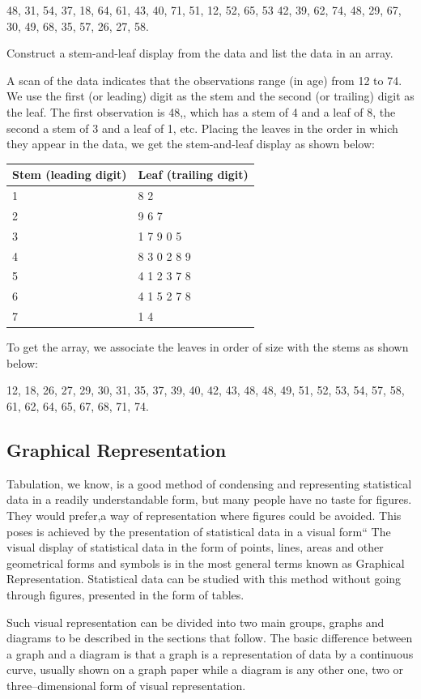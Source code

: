 \documentclass[]{article}
\begin{document}
48, 31, 54, 37, 18, 64, 61, 43, 40, 71, 51, 12, 52, 65, 53 42, 39, 62,
74, 48, 29, 67, 30, 49, 68, 35, 57, 26, 27, 58.

Construct a stem-and-leaf display from the data and list the data in an
array.

A scan of the data indicates that the observations range (in age) from
12 to 74. We use the first (or leading) digit as the stem and the second
(or trailing) digit as the leaf. The first observation is 48,, which has
a stem of 4 and a leaf of 8, the second a stem of 3 and a leaf of 1,
etc. Placing the leaves in the order in which they appear in the data,
we get the stem-and-leaf display as shown below:

\begin{longtable}[]{@{}ll@{}}
\toprule
Stem (leading digit) & Leaf (trailing digit)\tabularnewline
\midrule
\endhead
1 & 8 2\tabularnewline
2 & 9 6 7\tabularnewline
3 & 1 7 9 0 5\tabularnewline
4 & 8 3 0 2 8 9\tabularnewline
5 & 4 1 2 3 7 8\tabularnewline
6 & 4 1 5 2 7 8\tabularnewline
7 & 1 4\tabularnewline
\bottomrule
\end{longtable}

To get the array, we associate the leaves in order of size with the
stems as shown below:

12, 18, 26, 27, 29, 30, 31, 35, 37, 39, 40, 42, 43, 48, 48, 49, 51, 52,
53, 54, 57, 58, 61, 62, 64, 65, 67, 68, 71, 74.

\hypertarget{graphical-representation}{%
\subsection{Graphical Representation}\label{graphical-representation}}

Tabulation, we know, is a good method of condensing and representing
statistical data in a readily understandable form, but many people have
no taste for figures. They would prefer,a way of representation where
figures could be avoided. This poses is achieved by the presentation of
statistical data in a visual form`` The visual display of statistical
data in the form of points, lines, areas and other geometrical forms and
symbols is in the most general terms known as Graphical Representation.
Statistical data can be studied with this method without going through
figures, presented in the form of tables.

Such visual representation can be divided into two main groups, graphs
and diagrams to be described in the sections that follow. The basic
difference between a graph and a diagram is that a graph is a
representation of data by a continuous curve, usually shown on a graph
paper while a diagram is any other one, two or three--dimensional form
of visual representation.
\end{document}
